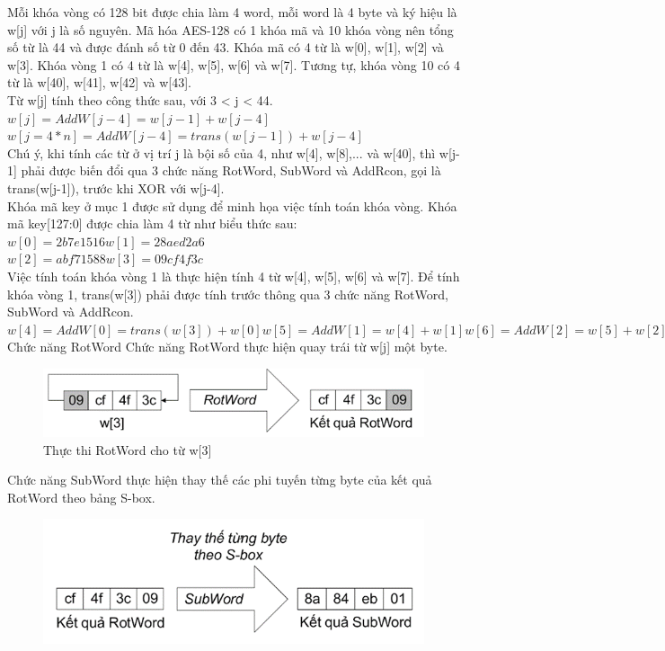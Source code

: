 \begin{itemize}
\begin{figure}[H]
    \end{figure}
    Mỗi khóa vòng có 128 bit được chia làm 4 word, mỗi word là 4 byte và ký hiệu là w[j] với j là số nguyên. Mã hóa AES-128 có 1 khóa mã và 10 khóa vòng nên tổng số từ là 44 và được đánh số từ 0 đến 43. Khóa mã có 4 từ là w[0], w[1], w[2] và w[3]. Khóa vòng 1 có 4 từ là w[4], w[5], w[6] và w[7]. Tương tự, khóa vòng 10 có 4 từ là w[40], w[41], w[42] và w[43].\\
    Từ w[j] tính theo công thức sau, với 3 < j < 44.\\
    $w[j] = AddW[j - 4] = w[j - 1] + w[j - 4]$ \\  
    $w[j = 4*n] = AddW[j - 4] = trans(w[j - 1])+ w[j - 4]$\\
    Chú ý, khi tính các từ ở vị trí j là bội số của 4, như w[4], w[8],... và w[40], thì w[j-1] phải được biến đổi qua 3 chức năng RotWord, SubWord và AddRcon, gọi là trans(w[j-1]), trước khi XOR với w[j-4].\\
    Khóa mã key ở mục 1 được sử dụng để minh họa việc tính toán khóa vòng. Khóa mã key[127:0] được chia làm 4 từ như biểu thức sau:\\
    $w[0] = 2b7e1516 w[1] = 28aed2a6$ \\
    $w[2] = abf71588 w[3] = 09cf4f3c$\\
    Việc tính toán khóa vòng 1 là thực hiện tính 4 từ w[4], w[5], w[6] và w[7]. Để tính khóa vòng 1, trans(w[3]) phải được tính trước thông qua 3 chức năng RotWord, SubWord và AddRcon.\\
    $w[4] = AddW[0] = trans(w[3])+ w[0]w[5] = AddW[1] = w[4]+ w[1]w[6] = AddW[2] = w[5]+ w[2]w[7] = AddW[3] = w[6]+ w[3]$\\
    Chức năng RotWord Chức năng RotWord thực hiện quay trái từ w[j] một byte.
    \begin{figure}[H]
        \centering
        \includegraphics{Ảnh/hiền/rword.png}
        \caption{Thực thi RotWord cho từ w[3]}
    \end{figure}
    Chức năng SubWord thực hiện thay thế các phi tuyến từng byte của kết quả RotWord theo bảng S-box.
    \begin{figure}[H]
        \centering
        \includegraphics{Ảnh/hiền/subw.png}

\end{figure}
\end{itemize}

